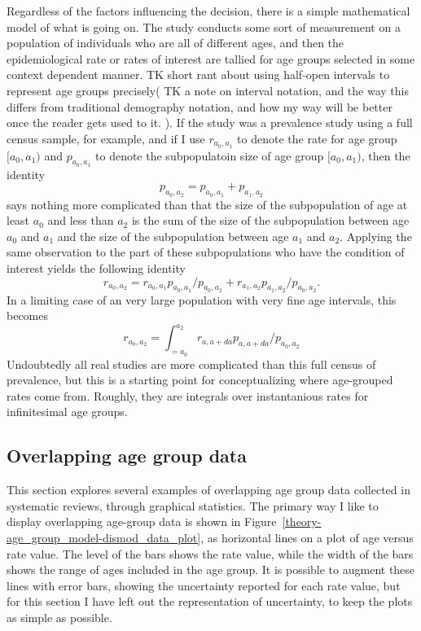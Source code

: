 Regardless of the factors influencing the decision, there is a simple
mathematical model of what is going on.  The study conducts some sort
of measurement on a population of individuals who are all of different
ages, and then the epidemiological rate or rates of interest are
tallied for age groups selected in some context dependent manner. TK
short rant about using half-open intervals to represent age groups
precisely( TK a note on interval notation, and the way this differs
from traditional demography notation, and how my way will be better
once the reader gets used to it.  ). If the study was a prevalence
study using a full census sample, for example, and if I use
$r_{a_0,a_1}$ to denote the rate for age group $[a_0, a_1)$ and
  $p_{a_0,a_1}$ to denote the subpopulatoin size of age group $[a_0,
    a_1)$, then the identity
\[
p_{a_0, a_2} = p_{a_0,a_1} + p_{a_1,a_2}
\]
says nothing more complicated than that the size of the subpopulation
of age at least $a_0$ and less than $a_2$ is the sum of the size of
the subpopulation between age $a_0$ and $a_1$ and the size of the subpopulation between age $a_1$ and $a_2$.  Applying the same observation to the part of these subpopulations who have the condition of interest yields the following identity
\[
r_{a_0,a_2} = r_{a_0,a_1}p_{a_0,a_1}/p_{a_0,a_2} + r_{a_1,a_2}p_{a_1,a_2}/p_{a_0,a_2}.
\]
In a limiting case of an very large population with very fine age intervals, this becomes
\[
r_{a_0,a_2} = \int_{=a_0}^{a_2} r_{a,a+da}p_{a,a+da}/p_{a_0,a_2}
\]
Undoubtedly all real studies are more complicated than this full
census of prevalence, but this is a starting point for conceptualizing
where age-grouped rates come from.  Roughly, they are integrals over
instantanious rates for infinitesimal age groups.

\subsection{Overlapping age group data}
\label{theory-age_group_model-overlapping_data}
This section explores several examples of overlapping age group data
collected in systematic reviews, through graphical statistics.  The
primary way I like to display overlapping age-group data is shown in
Figure~\ref{theory-age_group_model-dismod_data_plot}, as horizontal
lines on a plot of age versus rate value.  The level of the bars shows
the rate value, while the width of the bars shows the range of ages
included in the age group. It is possible to augment these lines with
error bars, showing the uncertainty reported for each rate value, but
for this section I have left out the representation of uncertainty, to
keep the plots as simple as possible.

